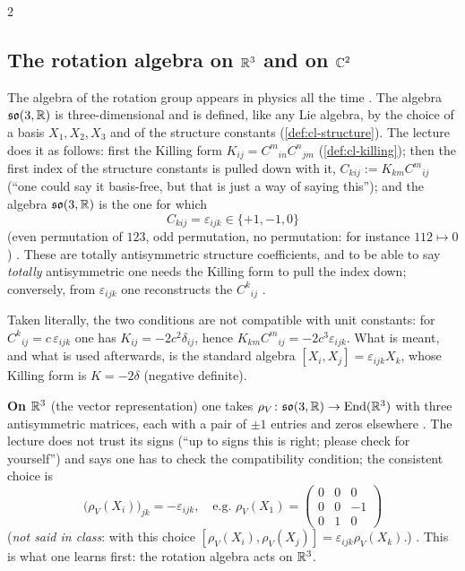 \begin{paracol}{2}
\subsection{The rotation algebra on $\mathbb{R}^3$ and on $\mathbb{C}^2$}\label{sec:rp-so3}
The algebra of the rotation group appears in physics all the time . The algebra $\mathfrak{so}(3,\mathbb{R})$ is three-dimensional and is defined, like any Lie algebra, by the choice of a basis $X_1,X_2,X_3$ and of the structure constants (\cref{def:cl-structure}). The lecture does it as follows: first the Killing form $K_{ij}=C^m{}_{in}C^n{}_{jm}$ (\cref{def:cl-killing}); then the first index of the structure constants is pulled down with it, $C_{kij}:=K_{km}C^m{}_{ij}$ (``one could say it basis-free, but that is just a way of saying this''); and the algebra $\mathfrak{so}(3,\mathbb{R})$ is the one for which
\[
  C_{kij}=\varepsilon_{ijk}\in\{+1,-1,0\}
\]
(even permutation of $123$, odd permutation, no permutation: for instance $112\mapsto0$)     . These are totally antisymmetric structure coefficients, and to be able to say \emph{totally} antisymmetric one needs the Killing form to pull the index down; conversely, from $\varepsilon_{ijk}$ one reconstructs the $C^k{}_{ij}$ .
\begin{coursenote}
Taken literally, the two conditions are not compatible with unit constants: for $C^k{}_{ij}=c\,\varepsilon_{ijk}$ one has $K_{ij}=-2c^2\delta_{ij}$, hence $K_{km}C^m{}_{ij}=-2c^3\varepsilon_{ijk}$. What is meant, and what is used afterwards, is the standard algebra $[X_i,X_j]=\varepsilon_{ijk}X_k$, whose Killing form is $K=-2\delta$ (negative definite). 
\end{coursenote}
\textbf{On $\mathbb{R}^3$} (the vector representation) one takes $\rho_V\colon\mathfrak{so}(3,\mathbb{R})\to\mathrm{End}(\mathbb{R}^3)$ with three antisymmetric matrices, each with a pair of $\pm1$ entries and zeros elsewhere   . The lecture does not trust its signs (``up to signs this is right; please check for yourself'') and says one has to check the compatibility condition; the consistent choice is
\[
  \bigl(\rho_V(X_i)\bigr)_{jk}=-\varepsilon_{ijk},\quad\text{e.g. }\rho_V(X_1)=\begin{pmatrix}0&0&0\\0&0&-1\\0&1&0\end{pmatrix}
\]
(\emph{not said in class}: with this choice $[\rho_V(X_i),\rho_V(X_j)]=\varepsilon_{ijk}\rho_V(X_k)$.)  . This is what one learns first: the rotation algebra acts on $\mathbb{R}^3$.


\end{paracol}
